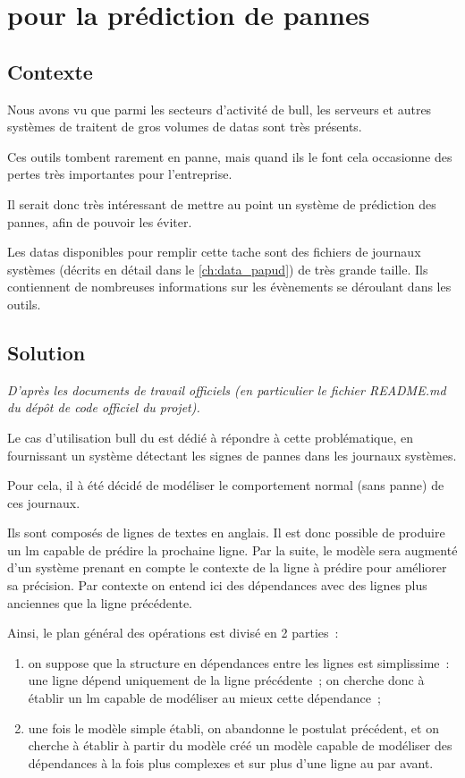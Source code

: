 \chapter{ pour la prédiction de pannes\label{ch:project_papud}}
\section{Contexte}
Nous avons vu que parmi les secteurs d'activité de \gls{bull}, les serveurs et autres systèmes de traitent de gros volumes de \glspl{data} sont très présents.

Ces outils tombent rarement en panne, mais quand ils le font cela occasionne des pertes très importantes pour l'entreprise.

Il serait donc très intéressant de mettre au point un système de prédiction des pannes, afin de pouvoir les éviter.

Les \glspl{data} disponibles pour remplir cette tache sont des fichiers de journaux systèmes (décrits en détail dans le \autoref{ch:data_papud}) de très grande taille.
Ils contiennent de nombreuses informations sur les évènements se déroulant dans les outils.

\section{Solution}\label{sec:solution}
\textit{D'après les documents de travail officiels (en particulier le fichier README.md du dépôt de code officiel du projet).} %

Le cas d'utilisation \gls{bull} du  est dédié à répondre à cette problématique, en fournissant un système détectant les signes de pannes dans les journaux systèmes.

Pour cela, il à été décidé de modéliser le comportement normal (sans panne) de ces journaux.

Ils sont composés de lignes de textes en anglais. Il est donc possible de produire un \gls{lm} capable de prédire la prochaine ligne.
Par la suite, le modèle sera augmenté d'un système prenant en compte le contexte de la ligne à prédire pour améliorer sa précision.
Par contexte on entend ici des dépendances avec des lignes plus anciennes que la ligne précédente.

Ainsi, le plan général des opérations est divisé en 2 parties~:
\begin{enumerate}
	\item on suppose que la structure en dépendances entre les lignes est simplissime~: une ligne dépend uniquement de la ligne précédente~; on cherche donc à établir un \gls{lm} capable de modéliser au mieux cette dépendance~;
	\item une fois le modèle simple établi, on abandonne le postulat précédent, et on cherche à établir à partir du modèle créé un modèle capable de modéliser des dépendances à la fois plus complexes et sur plus d'une ligne au par avant.
\end{enumerate}
\hspace{1em}


